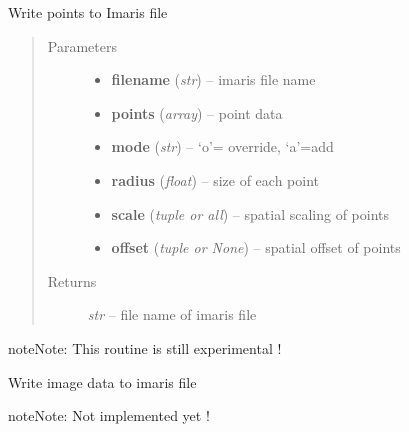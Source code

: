 \documentclass[letterpaper,10pt,english]{sphinxmanual}
\begin{document}
\begin{fulllineitems}
\label{api/ClearMap.IO:ClearMap.IO.Imaris.writePoints}
Write points to Imaris file
\begin{quote}\begin{description}
\item[{Parameters}] \leavevmode\begin{itemize}
\item {} 
\textbf{filename} (\emph{str}) --
imaris file name

\item {} 
\textbf{points} (\emph{array}) --
point data

\item {} 
\textbf{mode} (\emph{str}) --
`o'= override, `a'=add

\item {} 
\textbf{radius} (\emph{float}) --
size of each point

\item {} 
\textbf{scale} (\emph{tuple or all}) --
spatial scaling of points

\item {} 
\textbf{offset} (\emph{tuple or None}) --
spatial offset of points

\end{itemize}

\item[{Returns}] \leavevmode
\emph{str} --
file name of imaris file

\end{description}\end{quote}

\begin{notice}{note}{Note:}
This routine is still experimental !
\end{notice}

\end{fulllineitems}


\begin{fulllineitems}
\label{api/ClearMap.IO:ClearMap.IO.Imaris.writeData}
Write image data to imaris file

\begin{notice}{note}{Note:}
Not implemented yet !
\end{notice}

\end{fulllineitems}
\end{document}
